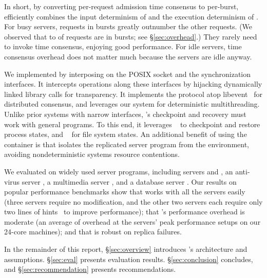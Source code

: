 In short, by converting per-request admission time consensus to per-burst,
\timealgo efficiently combines the input determinism of \paxos and the
execution determinism of \dmt.  For busy servers, requests in bursts
greatly outnumber the other requests.  (We observed that \timebubblelow to
\timebubblehigh of requests are in bursts; see \S\ref{sec:overhead}.) They
rarely need to invoke time consensus, enjoying good performance.  For idle
servers, time consensus overhead does not matter much because the servers
are idle anyway.



We implemented \xxx by interposing on the POSIX socket and the \pthread
synchronization interfaces.  It intercepts operations along these
interfaces by hijacking dynamically linked library calls for transparency.
It implements the \paxos protocol atop libevent~\cite{libevent} for
distributed consensus, and leverages our \parrot system for deterministic
multithreading.  Unlike prior \smr systems with narrow interfaces, \xxx's
checkpoint and recovery must work with general programs. To this end, it
leverages \criu~\cite{criu} to checkpoint and restore process states, and
\lxc~\cite{lxc} for file system states.  An additional benefit of using
the \lxc container is that \xxx isolates the replicated server program
from the environment, avoiding nondeterministic systems resource contentions.


We evaluated \xxx on \nprog widely used server programs,
including \http servers \apache and \mongoose, an anti-virus server
\clamav, a \upnp multimedia server \mediatomb, and a database server \mysql. 
Our results on popular performance benchmarks show that \xxx works with
all the servers easily (three servers require no modification, and the
other two servers each require only two lines of \parrot hints~\cite{parrot:sosp13}
to improve performance); that \xxx's performance overhead is
moderate (an average of \overhead overhead at the servers' peak 
performance setups on our 24-core machines); and that \xxx is robust on replica 
failures.

In the remainder of this report, \S\ref{sec:overview} introduces \xxx's 
architecture and assumptions. \S\ref{sec:eval} presents evaluation results. 
\S\ref{sec:conclusion} concludes, and \S\ref{sec:recommendation} presents 
recommendations.



























